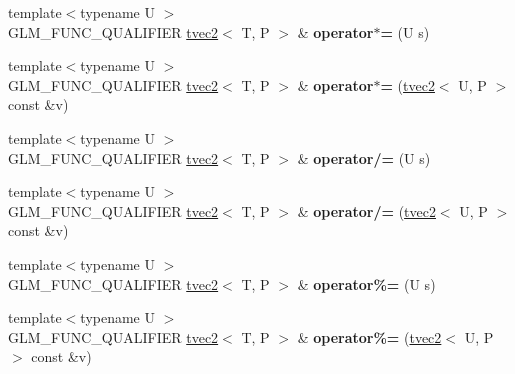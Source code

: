 \begin{DoxyCompactItemize}
\item 
{\footnotesize template$<$typename U $>$ }\\G\+L\+M\+\_\+\+F\+U\+N\+C\+\_\+\+Q\+U\+A\+L\+I\+F\+I\+ER \hyperlink{structglm_1_1detail_1_1tvec2}{tvec2}$<$ T, P $>$ \& {\bfseries operator$\ast$=} (U s)\hypertarget{structglm_1_1detail_1_1tvec2_ae5c779a289045f3a99c6ee7efa608248}{}\label{structglm_1_1detail_1_1tvec2_ae5c779a289045f3a99c6ee7efa608248}

\item 
{\footnotesize template$<$typename U $>$ }\\G\+L\+M\+\_\+\+F\+U\+N\+C\+\_\+\+Q\+U\+A\+L\+I\+F\+I\+ER \hyperlink{structglm_1_1detail_1_1tvec2}{tvec2}$<$ T, P $>$ \& {\bfseries operator$\ast$=} (\hyperlink{structglm_1_1detail_1_1tvec2}{tvec2}$<$ U, P $>$ const \&v)\hypertarget{structglm_1_1detail_1_1tvec2_a74848e484fd662c04e7193575af09d97}{}\label{structglm_1_1detail_1_1tvec2_a74848e484fd662c04e7193575af09d97}

\item 
{\footnotesize template$<$typename U $>$ }\\G\+L\+M\+\_\+\+F\+U\+N\+C\+\_\+\+Q\+U\+A\+L\+I\+F\+I\+ER \hyperlink{structglm_1_1detail_1_1tvec2}{tvec2}$<$ T, P $>$ \& {\bfseries operator/=} (U s)\hypertarget{structglm_1_1detail_1_1tvec2_ab7aa78f8b11b296c3f69bd97ea1cf210}{}\label{structglm_1_1detail_1_1tvec2_ab7aa78f8b11b296c3f69bd97ea1cf210}

\item 
{\footnotesize template$<$typename U $>$ }\\G\+L\+M\+\_\+\+F\+U\+N\+C\+\_\+\+Q\+U\+A\+L\+I\+F\+I\+ER \hyperlink{structglm_1_1detail_1_1tvec2}{tvec2}$<$ T, P $>$ \& {\bfseries operator/=} (\hyperlink{structglm_1_1detail_1_1tvec2}{tvec2}$<$ U, P $>$ const \&v)\hypertarget{structglm_1_1detail_1_1tvec2_a1825aedcd2a9a93e31e15f24fe690dbd}{}\label{structglm_1_1detail_1_1tvec2_a1825aedcd2a9a93e31e15f24fe690dbd}

\item 
{\footnotesize template$<$typename U $>$ }\\G\+L\+M\+\_\+\+F\+U\+N\+C\+\_\+\+Q\+U\+A\+L\+I\+F\+I\+ER \hyperlink{structglm_1_1detail_1_1tvec2}{tvec2}$<$ T, P $>$ \& {\bfseries operator\%=} (U s)\hypertarget{structglm_1_1detail_1_1tvec2_a71fc811c1ce1628d6bfec02d4603d890}{}\label{structglm_1_1detail_1_1tvec2_a71fc811c1ce1628d6bfec02d4603d890}

\item 
{\footnotesize template$<$typename U $>$ }\\G\+L\+M\+\_\+\+F\+U\+N\+C\+\_\+\+Q\+U\+A\+L\+I\+F\+I\+ER \hyperlink{structglm_1_1detail_1_1tvec2}{tvec2}$<$ T, P $>$ \& {\bfseries operator\%=} (\hyperlink{structglm_1_1detail_1_1tvec2}{tvec2}$<$ U, P $>$ const \&v)\hypertarget{structglm_1_1detail_1_1tvec2_a80bb57e041c1b98953c54d896dae08dc}{}\label{structglm_1_1detail_1_1tvec2_a80bb57e041c1b98953c54d896dae08dc}


\end{DoxyCompactItemize}
